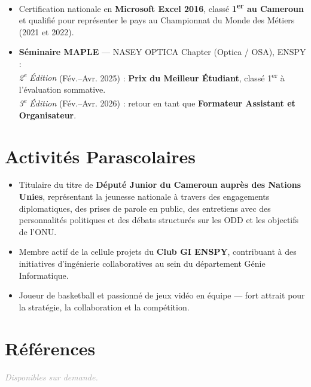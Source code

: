 \documentclass[10pt, a4paper]{article}
\begin{document}
\begin{itemize}
  \item Certification nationale en \textbf{Microsoft Excel 2016}, classé \textbf{1\textsuperscript{er}
        au Cameroun} et qualifié pour représenter le pays au Championnat du Monde des Métiers
        (2021 et 2022).
  \item \textbf{Séminaire MAPLE} — NASEY OPTICA Chapter (Optica / OSA), ENSPY :\\
        \textit{2\textsuperscript{e} Édition} (Fév.--Avr. 2025) : \textbf{Prix du Meilleur Étudiant},
        classé 1\textsuperscript{er} à l'évaluation sommative.\\
        \textit{3\textsuperscript{e} Édition} (Fév.--Avr. 2026) : retour en tant que
        \textbf{Formateur Assistant et Organisateur}.
\end{itemize}

\section{Activités Parascolaires}

\begin{itemize}
  \item Titulaire du titre de \textbf{Député Junior du Cameroun auprès des Nations Unies},
        représentant la jeunesse nationale à travers des engagements diplomatiques, des prises
        de parole en public, des entretiens avec des personnalités politiques et des débats
        structurés sur les ODD et les objectifs de l'ONU.
  \item Membre actif de la cellule projets du \textbf{Club GI ENSPY}, contribuant à des
        initiatives d'ingénierie collaboratives au sein du département Génie Informatique.
  \item Joueur de basketball et passionné de jeux vidéo en équipe — fort attrait pour la stratégie,
        la collaboration et la compétition.
\end{itemize}

\section{Références}

\textit{\textcolor{darkgray}{Disponibles sur demande.}}
\end{document}
